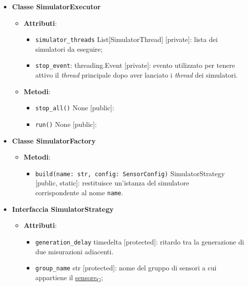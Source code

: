 \begin{itemize}
	\item \textbf{Classe SimulatorExecutor}
	      \begin{itemize}
		      \item \textbf{Attributi}:
		            \begin{itemize}
			            \item \texttt{simulator\_threads} List[SimulatorThread] [private]: lista dei simulatori da eseguire;
			            \item \texttt{stop\_event}: threading.Event [private]: evento utilizzato per tenere attivo il \textit{thread} principale dopo aver lanciato i \textit{thread} dei simulatori.
		            \end{itemize}
		      \item \textbf{Metodi}:
		            \begin{itemize}
			            \item \texttt{stop\_all()} None [public]:
			            \item \texttt{run()} None [public]:
		            \end{itemize}
	      \end{itemize}
	\item \textbf{Classe SimulatorFactory}
	      \begin{itemize}
		      \item \textbf{Metodi}:
		            \begin{itemize}
			            \item \texttt{build(name: str, config: SensorConfig)} SimulatorStrategy [public, static]: restituisce un'istanza del simulatore \\ corrispondente al nome \texttt{name}.
		            \end{itemize}
	      \end{itemize}
	\item \textbf{Interfaccia SimulatorStrategy}
	      \begin{itemize}
		      \item \textbf{Attributi}:
		            \begin{itemize}
			            \item \texttt{generation\_delay} timedelta [protected]: ritardo tra la generazione di due misurazioni adiacenti.
			            \item \texttt{group\_name} str [protected]: nome del gruppo di sensori a cui appartiene il \href{https://7last.github.io/docs/pb/documentazione-interna/glossario\#sensore}{sensore\textsubscript{G}};

\end{itemize}
\end{itemize}
\end{itemize}
